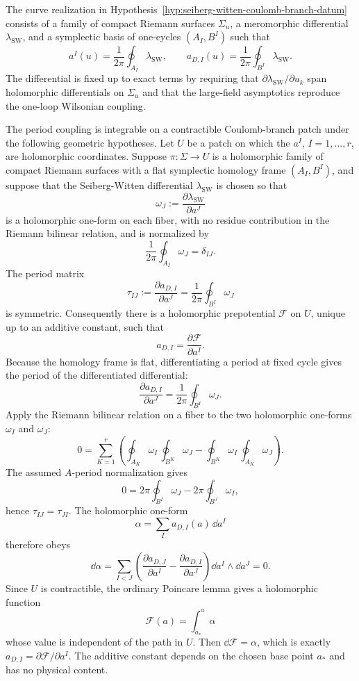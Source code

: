 The curve realization in
Hypothesis~\ref{hyp:seiberg-witten-coulomb-branch-datum} consists of a family
of compact Riemann surfaces \(\Sigma_u\), a meromorphic differential
\(\lambda_{\mathrm{SW}}\), and a symplectic basis of one-cycles
\((A_I,B^I)\) such that
\[
  a^I(u)=\frac{1}{2\pi}\oint_{A_I}\lambda_{\mathrm{SW}},
  \qquad
  a_{D,I}(u)=\frac{1}{2\pi}\oint_{B^I}\lambda_{\mathrm{SW}} .
\]
The differential is fixed up to exact terms by requiring that
\(\partial\lambda_{\mathrm{SW}}/\partial u_k\) span holomorphic differentials
on \(\Sigma_u\) and that the large-field asymptotics reproduce the
one-loop Wilsonian coupling.

The period coupling is integrable on a contractible Coulomb-branch patch
under the following geometric hypotheses.  Let \(U\) be a patch on which the
\(a^I\), \(I=1,\ldots,r\), are holomorphic coordinates.  Suppose
\(\pi:\Sigma\to U\) is a holomorphic family of compact Riemann surfaces with a
flat symplectic homology frame \((A_I,B^I)\), and suppose that the
Seiberg-Witten differential \(\lambda_{\mathrm{SW}}\) is chosen so that
\[
  \omega_J:=\frac{\partial\lambda_{\mathrm{SW}}}{\partial a^J}
\]
is a holomorphic one-form on each fiber, with no residue contribution in the
Riemann bilinear relation, and is normalized by
\[
  \frac1{2\pi}\oint_{A_I}\omega_J=\delta_{IJ}.
\]
The period matrix
\[
  \tau_{IJ}
  :=
  \frac{\partial a_{D,I}}{\partial a^J}
  =
  \frac1{2\pi}\oint_{B^I}\omega_J
\]
is symmetric.  Consequently there is a holomorphic prepotential
\(\mathcal F\) on \(U\), unique up to an additive constant, such that
\[
  a_{D,I}=\frac{\partial\mathcal F}{\partial a^I}.
\]
Because the homology frame is flat, differentiating a period at fixed cycle
gives the period of the differentiated differential:
\[
  \frac{\partial a_{D,I}}{\partial a^J}
  =
  \frac1{2\pi}\oint_{B^I}\omega_J .
\]
Apply the Riemann bilinear relation on a fiber to the two holomorphic
one-forms \(\omega_I\) and \(\omega_J\):
\[
  0
  =
  \sum_{K=1}^r
  \left(
    \oint_{A_K}\omega_I\,\oint_{B^K}\omega_J
    -
    \oint_{B^K}\omega_I\,\oint_{A_K}\omega_J
  \right).
\]
The assumed \(A\)-period normalization gives
\[
  0
  =
  2\pi\oint_{B^I}\omega_J
  -
  2\pi\oint_{B^J}\omega_I,
\]
hence \(\tau_{IJ}=\tau_{JI}\).  The holomorphic one-form
\[
  \alpha=\sum_I a_{D,I}(a)\,\dd a^I
\]
therefore obeys
\[
  \dd\alpha
  =
  \sum_{I<J}
  \left(
    \frac{\partial a_{D,J}}{\partial a^I}
    -
    \frac{\partial a_{D,I}}{\partial a^J}
  \right)
  \dd a^I\wedge\dd a^J
  =
  0 .
\]
Since \(U\) is contractible, the ordinary Poincare lemma gives a holomorphic
function
\[
  \mathcal F(a)=\int_{a_\ast}^{a}\alpha
\]
whose value is independent of the path in \(U\).  Then
\(\dd\mathcal F=\alpha\), which is exactly
\(a_{D,I}=\partial\mathcal F/\partial a^I\).  The additive constant depends
on the chosen base point \(a_\ast\) and has no physical content.


